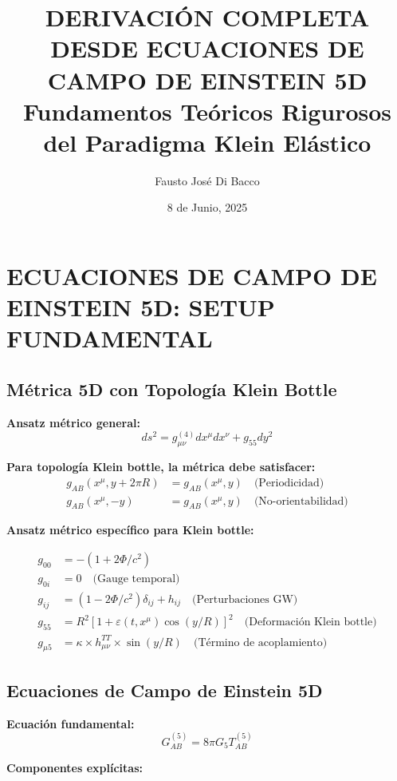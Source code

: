 \documentclass[12pt,a4paper]{article}
\title{\Large \textbf{DERIVACIÓN COMPLETA DESDE ECUACIONES DE CAMPO DE EINSTEIN 5D}\\
\large Fundamentos Teóricos Rigurosos del Paradigma Klein Elástico}
\author{Fausto José Di Bacco}
\date{8 de Junio, 2025}
\begin{document}
\maketitle

\section{ECUACIONES DE CAMPO DE EINSTEIN 5D: SETUP FUNDAMENTAL}

\subsection{Métrica 5D con Topología Klein Bottle}

\textbf{Ansatz métrico general:}
\begin{equation}
ds^2 = g_{\mu\nu}^{(4)} dx^\mu dx^\nu + g_{55} dy^2
\end{equation}

\textbf{Para topología Klein bottle, la métrica debe satisfacer:}
\begin{align}
g_{AB}(x^\mu, y + 2\pi R) &= g_{AB}(x^\mu, y) \quad \text{(Periodicidad)}\\
g_{AB}(x^\mu, -y) &= g_{AB}(x^\mu, y) \quad \text{(No-orientabilidad)}
\end{align}

\textbf{Ansatz métrico específico para Klein bottle:}

\begin{align}
g_{00} &= -(1 + 2\Phi/c^2)\\
g_{0i} &= 0 \quad \text{(Gauge temporal)}\\
g_{ij} &= (1 - 2\Phi/c^2)\delta_{ij} + h_{ij} \quad \text{(Perturbaciones GW)}\\
g_{55} &= R^2[1 + \varepsilon(t,x^\mu)\cos(y/R)]^2 \quad \text{(Deformación Klein bottle)}\\
g_{\mu 5} &= \kappa \times h_{\mu\nu}^{TT} \times \sin(y/R) \quad \text{(Término de acoplamiento)}
\end{align}

\subsection{Ecuaciones de Campo de Einstein 5D}

\textbf{Ecuación fundamental:}
\begin{equation}
G_{AB}^{(5)} = 8\pi G_5 T_{AB}^{(5)}
\end{equation}

\textbf{Componentes explícitas:}
\end{document}
